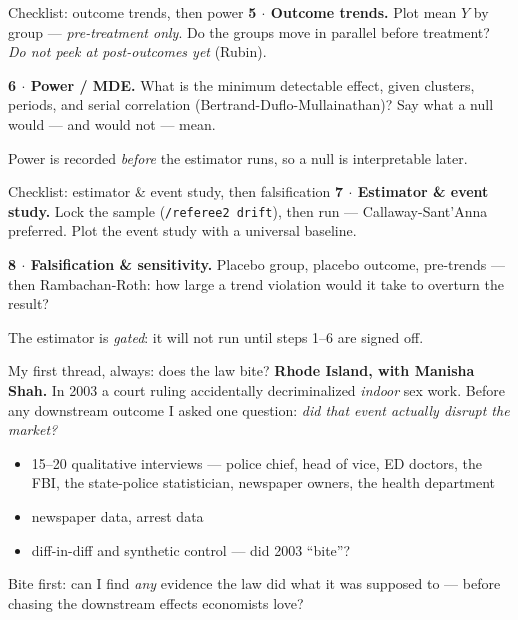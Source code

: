 \documentclass[aspectratio=169,11pt]{beamer}
\begin{document}
\begin{frame}{Checklist: outcome trends, then power}
\textbf{5 $\cdot$ Outcome trends.} Plot mean $Y$ by group --- \emph{pre-treatment only}. Do the groups move in parallel before treatment? \emph{Do not peek at post-outcomes yet} (Rubin).
\vspace{0.4cm}

\textbf{6 $\cdot$ Power / MDE.} What is the minimum detectable effect, given clusters, periods, and serial correlation (Bertrand-Duflo-Mullainathan)? Say what a null would --- and would not --- mean.
\vspace{0.3cm}

\alert{Power is recorded \emph{before} the estimator runs, so a null is interpretable later.}
\end{frame}

\begin{frame}{Checklist: estimator \& event study, then falsification}
\textbf{7 $\cdot$ Estimator \& event study.} Lock the sample (\texttt{/referee2 drift}), then run --- Callaway-Sant'Anna preferred. Plot the event study with a universal baseline.
\vspace{0.4cm}

\textbf{8 $\cdot$ Falsification \& sensitivity.} Placebo group, placebo outcome, pre-trends --- then Rambachan-Roth: how large a trend violation would it take to overturn the result?
\vspace{0.3cm}

\alert{The estimator is \emph{gated}: it will not run until steps 1--6 are signed off.}
\end{frame}

\begin{frame}{My first thread, always: does the law bite?}
\textbf{Rhode Island, with Manisha Shah.} In 2003 a court ruling accidentally decriminalized \emph{indoor} sex work. Before any downstream outcome I asked one question: \emph{did that event actually disrupt the market?}
\vspace{0.3cm}
\begin{itemize}\setlength\itemsep{0.18em}
    \item 15--20 qualitative interviews --- police chief, head of vice, ED doctors, the FBI, the state-police statistician, newspaper owners, the health department
    \item newspaper data, arrest data
    \item diff-in-diff and synthetic control --- did 2003 ``bite''?
\end{itemize}
\vspace{0.2cm}

\alert{Bite first: can I find \emph{any} evidence the law did what it was supposed to --- before chasing the downstream effects economists love?}
\end{frame}
\end{document}
